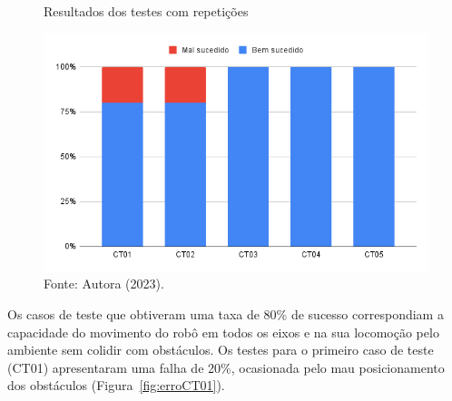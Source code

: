 \begin{figure}[h]
    \centering
    \caption{Resultados dos testes com repetições}
    \includegraphics[scale=0.65]{sucessoTestes.png}
    \caption*{Fonte: Autora (2023).}
    \label{fig:sucessoTestes}
\end{figure}

Os casos de teste que obtiveram uma taxa de 80\% de sucesso correspondiam a capacidade do movimento do robô em todos os eixos e na sua locomoção pelo ambiente sem colidir com obstáculos. Os testes para o primeiro caso de teste (CT01) apresentaram uma falha de 20\%, ocasionada pelo mau posicionamento dos obstáculos (Figura~\ref{fig:erroCT01}).


